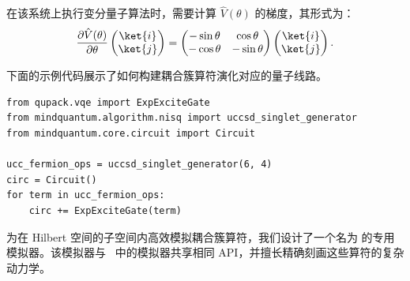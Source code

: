 在该系统上执行变分量子算法时，需要计算 $\hat{V}(\theta)$ 的梯度，其形式为：
\begin{equation}
    \frac{\partial \hat{V}(\theta)}{\partial\theta}\begin{pmatrix}
        \ket{i} \\\ket{j}
    \end{pmatrix}=\begin{pmatrix}
        -\sin\theta & \cos\theta  \\
        -\cos\theta & -\sin\theta
    \end{pmatrix}\begin{pmatrix}
        \ket{i} \\\ket{j}
    \end{pmatrix}.
\end{equation}

下面的示例代码展示了如何构建耦合簇算符演化对应的量子线路。

\begin{lstlisting}
from qupack.vqe import ExpExciteGate
from mindquantum.algorithm.nisq import uccsd_singlet_generator
from mindquantum.core.circuit import Circuit

ucc_fermion_ops = uccsd_singlet_generator(6, 4)
circ = Circuit()
for term in ucc_fermion_ops:
    circ += ExpExciteGate(term)
\end{lstlisting}

为在 Hilbert 空间的子空间内高效模拟耦合簇算符，我们设计了一个名为  的专用模拟器。该模拟器与 \MindQuantum\ 中的模拟器共享相同 API，并擅长精确刻画这些算符的复杂动力学。
